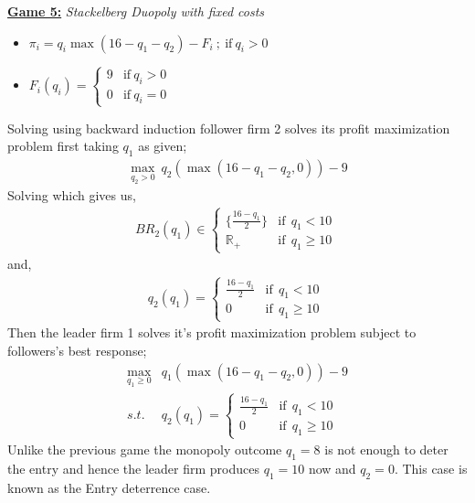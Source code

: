 \documentclass[10pt,leqno]{report}
\begin{document}
\textbf{\underline{Game 5:}} \textit{Stackelberg Duopoly with fixed costs} \\
\begin{tcolorbox}
    \begin{itemize}
        \item \(\pi_{i}=q_{i}\max(16-q_{1}-q_{2})-F_{i}\ ; \ \text{if} \ q_{i}>0\)
        \item \(F_{i}(q_{i})=\begin{cases}
            9 & \text{if} \ q_{i}>0 \\
            0 & \text{if} \ q_{i}=0
        \end{cases}\)
    \end{itemize}
\end{tcolorbox}
Solving using backward induction follower firm 2 solves its profit maximization problem first taking \(q_{1}\) as given;\\
\begin{align*}
    \max_{q_{2}>0} \ q_{2}(\max(16-q_{1}-q_{2},0))-9 
\end{align*}
Solving which gives us, \\
\begin{eqnarray*}
    BR_{2}(q_{1})\in \begin{cases}
        \{\frac{16-q_{1}}{2}\} &  \text{if} \ \ q_{1} < 10\ \\
        \mathbb{R}_{+}  & \text{if} \ \ q_{1}\geq 10
    \end{cases}
\end{eqnarray*}
and, 
\begin{eqnarray*}
    q_{2}(q_{1})=\begin{cases}
        \frac{16-q_{1}}{2} &  \text{if} \ \ q_{1} < 10\ \\
        0  & \text{if} \ \ q_{1}\geq 10
    \end{cases}
\end{eqnarray*}
Then the leader firm 1 solves it's profit maximization problem subject to followers's best response;
\begin{eqnarray*}
    \max_{q_{1}\geq 0} & q_{1}(\max(16-q_{1}-q_{2},0))-9 \\
    s.t. & q_{2}(q_{1})=\begin{cases}
        \frac{16-q_{1}}{2} &  \text{if} \ \ q_{1} < 10 \\
        0  & \text{if} \ \ q_{1}\geq 10
    \end{cases} 
\end{eqnarray*}
Unlike the previous game the monopoly outcome \(q_{1}=8\) is not enough to deter the entry and hence the leader firm produces \(q_{1}=10\) now and \(q_{2}=0\). This case is known as the Entry deterrence case.
\end{document}

